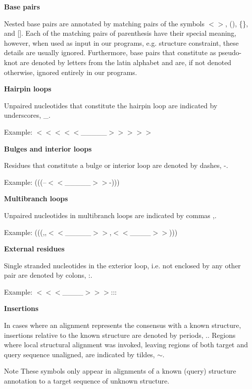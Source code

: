 \begin{DoxyItemize}
\item {\bfseries Base pairs}

Nested base pairs are annotated by matching pairs of the symbols {\ttfamily $<$$>$}, {\ttfamily ()}, {\ttfamily \{\}}, and {\ttfamily \mbox{[}\mbox{]}}. Each of the matching pairs of parenthesis have their special meaning, however, when used as input in our programs, e.\+g. structure constraint, these details are usually ignored. Furthermore, base pairs that constitute as pseudo-\/knot are denoted by letters from the latin alphabet and are, if not denoted otherwise, ignored entirely in our programs.
\item {\bfseries Hairpin loops}

Unpaired nucleotides that constitute the hairpin loop are indicated by underscores, {\ttfamily \+\_\+}.

Example\+: {\ttfamily $<$$<$$<$$<$$<$\+\_\+\+\_\+\+\_\+\+\_\+\+\_\+$>$$>$$>$$>$$>$}
\item {\bfseries Bulges and interior loops}

Residues that constitute a bulge or interior loop are denoted by dashes, {\ttfamily -\/}.

Example\+: {\ttfamily (((--$<$$<$\+\_\+\+\_\+\+\_\+\+\_\+\+\_\+$>$$>$-\/)))}
\item {\bfseries Multibranch loops}

Unpaired nucleotides in multibranch loops are indicated by commas {\ttfamily ,}.

Example\+: {\ttfamily (((,,$<$$<$\+\_\+\+\_\+\+\_\+\+\_\+\+\_\+$>$$>$,$<$$<$\+\_\+\+\_\+\+\_\+\+\_\+$>$$>$)))}
\item {\bfseries External residues}

Single stranded nucleotides in the exterior loop, i.\+e. not enclosed by any other pair are denoted by colons, {\ttfamily \+:}.

Example\+: {\ttfamily $<$$<$$<$\+\_\+\+\_\+\+\_\+\+\_\+$>$$>$$>$\+:\+:\+:}
\item {\bfseries Insertions}

In cases where an alignment represents the consensus with a known structure, insertions relative to the known structure are denoted by periods, {\ttfamily .}. Regions where local structural alignment was invoked, leaving regions of both target and query sequence unaligned, are indicated by tildes, {\ttfamily $\sim$}. \begin{DoxyNote}{Note}
These symbols only appear in alignments of a known (query) structure annotation to a target sequence of unknown structure.
\end{DoxyNote}


\end{DoxyItemize}
